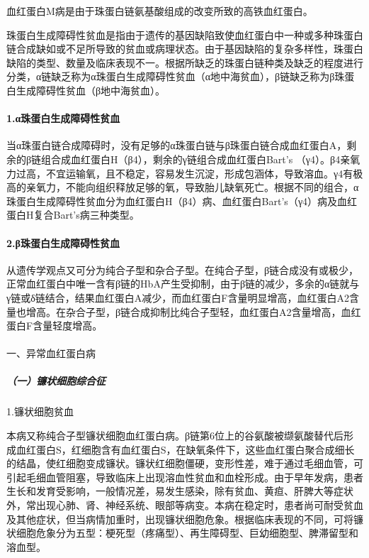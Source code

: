 血红蛋白M病是由于珠蛋白链氨基酸组成的改变所致的高铁血红蛋白。

珠蛋白生成障碍性贫血是指由于遗传的基因缺陷致使血红蛋白中一种或多种珠蛋白链合成缺如或不足所导致的贫血或病理状态。由于基因缺陷的复杂多样性，珠蛋白缺陷的类型、数量及临床表现不一。根据所缺乏的珠蛋白链种类及缺乏的程度进行分类，α链缺乏称为α珠蛋白生成障碍性贫血（α地中海贫血），β链缺乏称为β珠蛋白生成障碍性贫血（β地中海贫血）。

\paragraph{1.α珠蛋白生成障碍性贫血}

当α珠蛋白链合成障碍时，没有足够的α珠蛋白链与β珠蛋白链合成血红蛋白A，剩余的β链组合成血红蛋白H（β4），剩余的γ链组合成血红蛋白Bart's
（γ4）。β4亲氧力过高，不宜运输氧，且不稳定，容易发生沉淀，形成包涵体，导致溶血。γ4有极高的亲氧力，不能向组织释放足够的氧，导致胎儿缺氧死亡。根据不同的组合，α珠蛋白生成障碍性贫血分为血红蛋白H（β4）病、血红蛋白Bart's（γ4）病及血红蛋白H复合Bart's病三种类型。

\paragraph{2.β珠蛋白生成障碍性贫血}

从遗传学观点又可分为纯合子型和杂合子型。在纯合子型，β链合成没有或极少，正常血红蛋白中唯一含有β链的HbA产生受抑制，由于β链的减少，多余的α链就与γ链或δ链结合，结果血红蛋白A减少，而血红蛋白F含量明显增高，血红蛋白A2含量也增高。在杂合子型，β链合成抑制比纯合子型轻，血红蛋白A2含量增高，血红蛋白F含量轻度增高。

\paragraph{}{一、异常血红蛋白病}

\subparagraph{（一）镰状细胞综合征}

1.镰状细胞贫血%

本病又称纯合子型镰状细胞血红蛋白病。β链第6位上的谷氨酸被缬氨酸替代后形成血红蛋白S，红细胞含有血红蛋白S，在缺氧条件下，这些血红蛋白聚合成细长的结晶，使红细胞变成镰状。镰状红细胞僵硬，变形性差，难于通过毛细血管，可引起毛细血管阻塞，导致临床上出现溶血性贫血和血栓形成。由于早年发病，患者生长和发育受影响，一般情况差，易发生感染，除有贫血、黄疸、肝脾大等症状外，常出现心肺、肾、神经系统、眼部等病变。本病在稳定时，患者尚可耐受贫血及其他症状，但当病情加重时，出现镰状细胞危象。根据临床表现的不同，可将镰状细胞危象分为五型：梗死型（疼痛型）、再生障碍型、巨幼细胞型、脾滞留型和溶血型。

